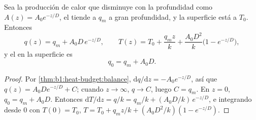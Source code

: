 \begin{theorem}\label{thm:b1:heat-budget:exponential}
Sea la producción de calor que disminuye con la profundidad como $A(z) = A_0 e^{-z/D}$, el  tiende a $q_m$ a gran
profundidad, y la superficie está a $T_0$. Entonces
\[
  q(z) = q_m + A_0 D\,e^{-z/D}, \qquad
  T(z) = T_0 + \frac{q_m z}{k} + \frac{A_0 D^2}{k}\bigl(1 - e^{-z/D}\bigr),
\]
y el  en la superficie es
\[
  q_0 = q_m + A_0 D .
\]
\end{theorem}

\begin{proof}
Por \cref{thm:b1:heat-budget:balance}, $\mathrm dq/\mathrm dz =
-A_0e^{-z/D}$, así que $q(z) = A_0 D e^{-z/D} + C$; cuando $z \to \infty$,
$q \to C$, luego $C = q_m$. En $z = 0$, $q_0 = q_m + A_0 D$. Entonces $\mathrm dT/\mathrm dz =
q/k = q_m/k + (A_0D/k)\,e^{-z/D}$, e
integrando desde $0$ con $T(0) = T_0$, $T = T_0 + q_m z/k + (A_0 D^2/k)(1 - e^{-z/D})$.
\end{proof}

